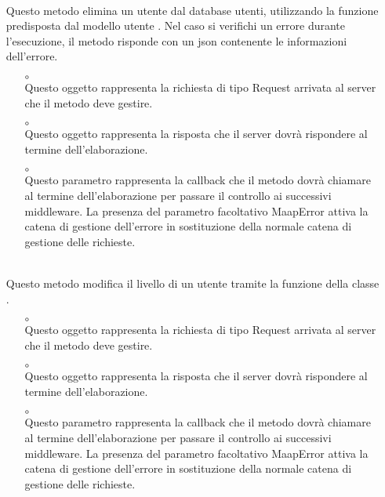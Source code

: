 \begin{itemize}
\begin{itemize}
\end{itemize}
\item[]  \\ Questo metodo elimina un utente dal database utenti, utilizzando la funzione predisposta dal modello utente . Nel caso si verifichi un errore durante l'esecuzione, il metodo risponde con un json contenente le informazioni dell'errore.
\begin{itemize}\addtolength{\itemsep}{-0.5\baselineskip}
\item[$\circ$]  \\ Questo oggetto rappresenta la richiesta di tipo Request arrivata al server che il metodo deve gestire.
\item[$\circ$]  \\ Questo oggetto rappresenta la risposta che il server dovrà rispondere al termine dell'elaborazione.
\item[$\circ$]  \\ Questo parametro rappresenta la callback che il metodo dovrà chiamare al termine dell'elaborazione per passare il controllo ai successivi middleware. La presenza del parametro facoltativo MaapError attiva la catena di gestione dell'errore in sostituzione della normale catena di gestione delle richieste.
\end{itemize}
\item[]  \\ Questo metodo modifica il livello di un utente tramite la funzione  della classe .
\begin{itemize}\addtolength{\itemsep}{-0.5\baselineskip}
\item[$\circ$]  \\ Questo oggetto rappresenta la richiesta di tipo Request arrivata al server che il metodo deve gestire.
\item[$\circ$]  \\ Questo oggetto rappresenta la risposta che il server dovrà rispondere al termine dell'elaborazione.
\item[$\circ$]  \\ Questo parametro rappresenta la callback che il metodo dovrà chiamare al termine dell'elaborazione per passare il controllo ai successivi middleware. La presenza del parametro facoltativo MaapError attiva la catena di gestione dell'errore in sostituzione della normale catena di gestione delle richieste.
\end{itemize}
\end{itemize}

